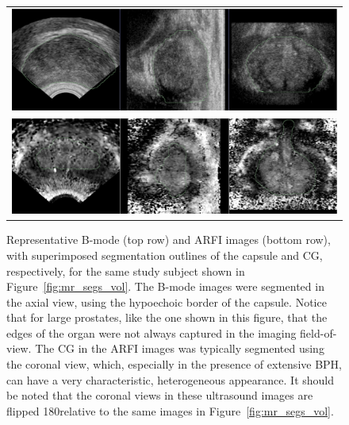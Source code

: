 \begin{figure}[htb!]
\centering
\begin{tabular}{c}
\includegraphics[width=1.0\textwidth]{figs/Bmode_CapsuleSegs.eps} \\
\includegraphics[width=1.0\textwidth]{figs/ARFI_CGsegs.eps} \\
\end{tabular}
\caption{Representative B-mode (top row) and ARFI images (bottom row), with
    superimposed segmentation outlines of the capsule and CG, respectively, for
    the same study subject shown in Figure~\ref{fig:mr_segs_vol}.  The B-mode
    images were segmented in the axial view, using the hypoechoic border of the
    capsule.  Notice that for large prostates, like the one shown in this
    figure, that the edges of the organ were not always captured in the imaging
    field-of-view.  The CG in the ARFI images was typically segmented using the
    coronal view, which, especially in the presence of extensive BPH, can have
    a very characteristic, heterogeneous appearance.  It should be noted that
    the coronal views in these ultrasound images are flipped 180\degree relative
    to the same images in Figure~\ref{fig:mr_segs_vol}.}
\label{fig:arfi_segs} 
\end{figure}
